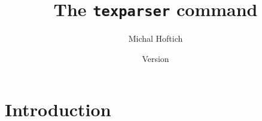 \documentclass{ltxdoc}
\title{The \texttt{texparser} command}
\author{Michal Hoftich\authormail{michal.h21@gmail.com}}
\date{Version \expandafter\csname version\endcsname\\\expandafter\csname gitdate\endcsname}
\begin{document}
\maketitle
\tableofcontents

\begin{abstract}
\end{abstract}
\section{Introduction}
\end{document}
